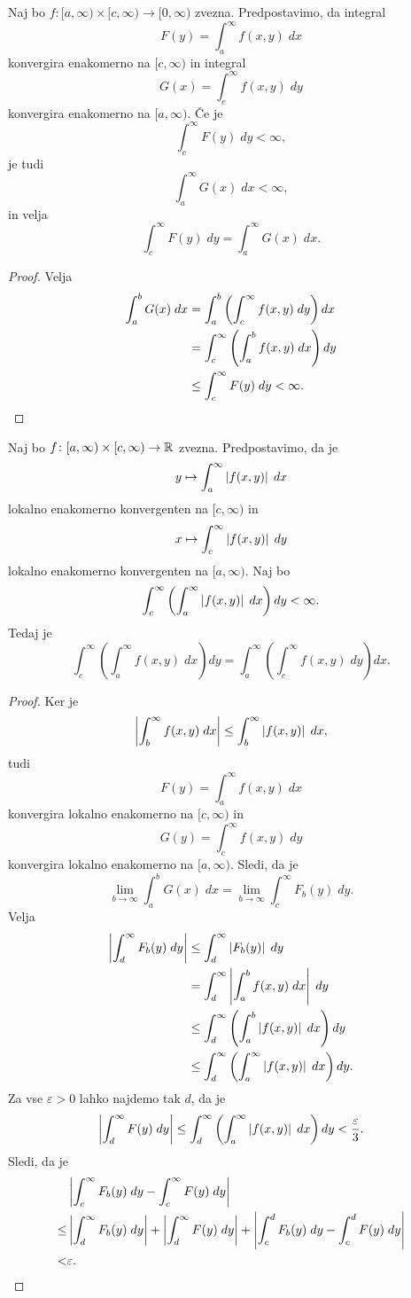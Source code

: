 \begin{izrek}[Fubini]
Naj bo $f \colon [a,\infty) \times [c,\infty) \to [0,\infty)$
zvezna. Predpostavimo, da integral
\[
F(y) = \int_a^\infty f(x,y)\;dx
\]
konvergira enakomerno na $[c,\infty)$ in integral
\[
G(x) = \int_c^\infty f(x,y)\;dy
\]
konvergira enakomerno na $[a,\infty)$. Če je
\[
\int_c^\infty F(y)\;dy < \infty,
\]
je tudi
\[
\int_a^\infty G(x)\;dx < \infty,
\]
in velja
\[
\int_c^\infty F(y)\;dy = \int_a^\infty G(x)\;dx.
\]
\end{izrek}

\begin{proof}
Velja
\begin{align*}
\int_a^b G(x)\;dx &=
\int_a^b \left(\int_c^\infty f(x,y)\;dy \right)dx
\\
&=
\int_c^\infty \left(\int_a^b f(x,y)\;dx\right)dy
\\
&\leq
\int_c^\infty F(y)\;dy < \infty. \qedhere
\end{align*}
\end{proof}

\begin{izrek}[Fubini]
Naj bo $f \colon [a,\infty) \times [c,\infty) \to \mathbb{R}$ zvezna.
Predpostavimo, da je
\[
y \mapsto \int_a^\infty \left\lvert f(x,y)\right\rvert\;dx
\]
lokalno enakomerno konvergenten na $[c,\infty)$ in
\[
x \mapsto \int_c^\infty \left\lvert f(x,y)\right\rvert\;dy
\]
lokalno enakomerno konvergenten na $[a,\infty)$. Naj bo
\[
\int_c^\infty \left(\int_a^\infty \left\lvert f(x,y)\right\rvert\;dx\right)dy < \infty.
\]
Tedaj je
\[
\int_c^\infty \left(\int_a^\infty f(x,y)\;dx\right)dy =
\int_a^\infty \left(\int_c^\infty f(x,y)\;dy\right)dx.
\]
\end{izrek}

\begin{proof}
Ker je
\[
\left\lvert \int_b^\infty f(x,y)\;dx\right\rvert \leq \int_b^\infty \left\lvert f(x,y)\right\rvert\;dx,
\]
tudi
\[
F(y) = \int_a^\infty f(x,y)\;dx
\]
konvergira lokalno enakomerno na $[c,\infty)$ in
\[
G(y) = \int_c^\infty f(x,y)\;dy
\]
konvergira lokalno enakomerno na $[a,\infty)$. Sledi, da je
\[
\lim_{b \to \infty}\int_a^b G(x)\;dx =
\lim_{b \to \infty}
\int_c^\infty F_b(y)\;dy.
\]
Velja
\begin{align*}
\left\lvert \int_d^\infty F_b(y)\;dy\right\rvert &\leq
\int_d^\infty \left\lvert F_b(y)\right\rvert\;dy
\\
&=
\int_d^\infty \left\lvert \int_a^b f(x,y)\;dx\right\rvert\;dy
\\
&\leq
\int_d^\infty \left(\int_a^b \left\lvert f(x,y)\right\rvert\;dx\right)dy
\\
&\leq
\int_d^\infty \left(\int_a^\infty \left\lvert f(x,y)\right\rvert\;dx\right)dy.
\end{align*}
Za vse $\varepsilon > 0$ lahko najdemo tak $d$, da je
\[
\left\lvert \int_d^\infty F(y)\;dy\right\rvert \leq
\int_d^\infty \left(\int_a^\infty \left\lvert f(x,y)\right\rvert\;dx\right)dy <
\frac{\varepsilon}{3}.
\]
Sledi, da je
\begin{align*}
&\left\lvert \int_c^\infty F_b(y)\;dy - \int_c^\infty F(y)\;dy\right\rvert
\\
\leq&
\left\lvert \int_d^\infty F_b(y)\;dy\right\rvert +
\left\lvert \int_d^\infty F(y)\;dy\right\rvert +
\left\lvert \int_c^d F_b(y)\;dy - \int_c^d F(y)\;dy\right\rvert
\\
<&
\varepsilon. \qedhere
\end{align*}
\end{proof}
